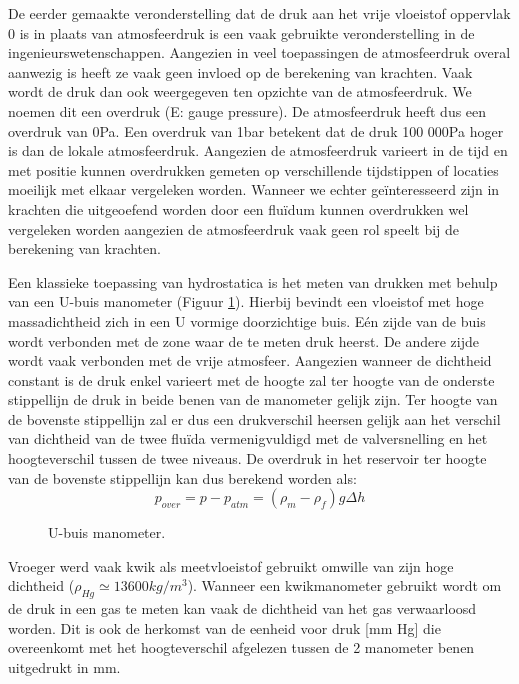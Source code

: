 De eerder gemaakte veronderstelling dat de druk aan het vrije vloeistof oppervlak 0 is in plaats van atmosfeerdruk is een vaak gebruikte veronderstelling in de ingenieurswetenschappen. Aangezien in veel toepassingen de atmosfeerdruk overal aanwezig is heeft ze vaak geen invloed op de berekening van krachten. Vaak wordt de druk dan ook weergegeven ten opzichte van de atmosfeerdruk. We noemen dit een overdruk (E: gauge pressure). De atmosfeerdruk heeft dus een overdruk van 0\unit{Pa}. Een overdruk van 1\unit{bar} betekent dat de druk 100 000\unit{Pa} hoger is dan de lokale atmosfeerdruk. Aangezien de atmosfeerdruk varieert in de tijd en met positie kunnen overdrukken gemeten op verschillende tijdstippen of locaties moeilijk met elkaar vergeleken worden. Wanneer we echter geïnteresseerd zijn in krachten die uitgeoefend worden door een fluïdum kunnen overdrukken wel vergeleken worden aangezien de atmosfeerdruk vaak geen rol speelt bij de berekening van krachten.


Een klassieke toepassing van hydrostatica is het meten van drukken met behulp van een U-buis manometer (Figuur \ref{fig:Ubuis_manometer}). Hierbij bevindt een vloeistof met hoge massadichtheid zich in een U vormige doorzichtige buis. E\'en zijde van de buis wordt verbonden met de zone waar de te meten druk heerst. De andere zijde wordt vaak verbonden met de vrije atmosfeer. Aangezien wanneer de dichtheid constant is de druk enkel varieert met de hoogte zal ter hoogte van de onderste stippellijn de druk in beide benen van de manometer gelijk zijn. Ter hoogte van de bovenste stippellijn zal er dus een drukverschil heersen gelijk aan het verschil van dichtheid van de twee fluïda vermenigvuldigd met de valversnelling en het hoogteverschil tussen de twee niveaus. De overdruk in het reservoir ter hoogte van de bovenste stippellijn kan dus berekend worden als: 
\begin{equation}
	p_{over} = p-p_{atm} = (\rho_m-\rho_f) g \Delta h
\end{equation}
\begin{figure}[htb]
	\centering
	
	\caption{U-buis manometer.}
	\label{fig:Ubuis_manometer}
\end{figure}
Vroeger werd vaak kwik als meetvloeistof gebruikt omwille van zijn hoge dichtheid ($\rho_{Hg} \simeq 13600\unit{kg/m^3}$). Wanneer een kwikmanometer gebruikt wordt om de druk in een gas te meten kan vaak de dichtheid van het gas verwaarloosd worden. Dit is ook de herkomst van de eenheid voor druk [mm Hg] die overeenkomt met het hoogteverschil afgelezen tussen de 2 manometer benen uitgedrukt in mm.

